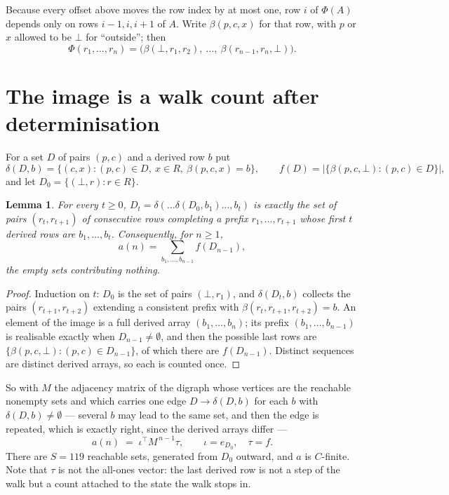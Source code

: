 \documentclass[11pt,a4paper]{article}
\theoremstyle{plain}
\newtheorem{lemma}[theorem]{Lemma}
\theoremstyle{definition}
\begin{document}
Because every offset above moves the row index by at most one, row $i$ of
$\Phi(A)$ depends only on rows $i-1,i,i+1$ of $A$. Write $\beta(p,c,x)$ for that row, with $p$
or $x$ allowed to be $\bot$ for ``outside''; then
\[
\Phi(r_1,\dots,r_n)=\bigl(\beta(\bot,r_1,r_2),\ \dots,\ \beta(r_{n-1},r_n,\bot)\bigr).
\]

\section{The image is a walk count after determinisation}

For a set $D$ of pairs $(p,c)$ and a derived row $b$ put
\[
\delta(D,b)=\{(c,x):(p,c)\in D,\ x\in R,\ \beta(p,c,x)=b\},\qquad
f(D)=\bigl|\{\beta(p,c,\bot):(p,c)\in D\}\bigr| ,
\]
and let $D_0=\{(\bot,r):r\in R\}$.

\begin{lemma}\label{lem:det}
For every $t\ge0$, $D_t=\delta(\dots\delta(D_0,b_1)\dots,b_t)$ is exactly the set of pairs
$(r_t,r_{t+1})$ of consecutive rows completing a prefix $r_1,\dots,r_{t+1}$ whose first $t$
derived rows are $b_1,\dots,b_t$. Consequently, for $n\ge1$,
\[
a(n)=\sum_{b_1,\dots,b_{n-1}}f(D_{n-1}),
\]
the empty sets contributing nothing.
\end{lemma}

\begin{proof}
Induction on $t$: $D_0$ is the set of pairs $(\bot,r_1)$, and $\delta(D_t,b)$ collects the
pairs $(r_{t+1},r_{t+2})$ extending a consistent prefix with
$\beta(r_t,r_{t+1},r_{t+2})=b$. An element of the image is a full derived array
$(b_1,\dots,b_n)$; its prefix $(b_1,\dots,b_{n-1})$ is realisable exactly when
$D_{n-1}\neq\emptyset$, and then the possible last rows are
$\{\beta(p,c,\bot):(p,c)\in D_{n-1}\}$, of which there are $f(D_{n-1})$. Distinct sequences
are distinct derived arrays, so each is counted once.
\end{proof}

So with $M$ the adjacency matrix of the digraph whose vertices are the reachable nonempty sets
and which carries one edge $D\to\delta(D,b)$ for each $b$ with $\delta(D,b)\neq\emptyset$ ---
several $b$ may lead to the same set, and then the edge is repeated, which is exactly right,
since the derived arrays differ ---
\[
a(n)\;=\;\iota^{\!\top}M^{\,n-1}\tau,\qquad \iota=e_{D_0},\quad \tau=f .
\]
There are $S=119$ reachable sets, generated from $D_0$ outward, and $a$ is $C$-finite.
Note that $\tau$ is not the all-ones vector: the last derived row is not a
step of the walk but a count attached to the state the walk stops in.
\end{document}
